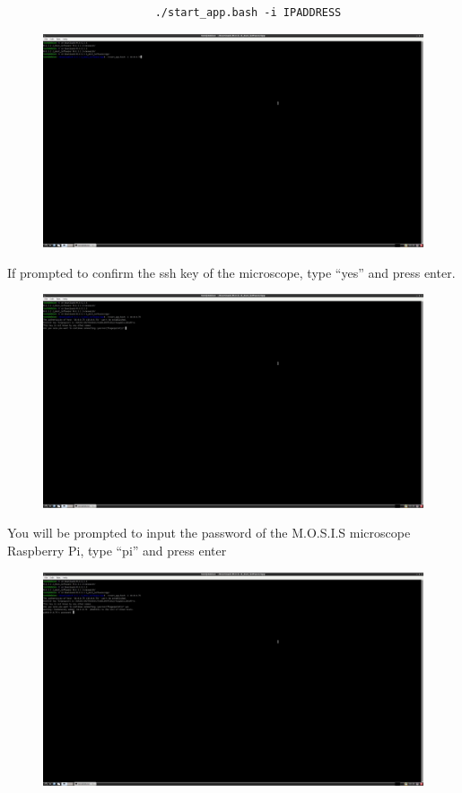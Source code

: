 \documentclass[12pt]{article}
\begin{document}
\begin{center}
	\begin{verbatim}
                       ./start_app.bash -i IPADDRESS
                      \end{verbatim}
	\begin{figure}[H]
		\includegraphics[width=\textwidth]{Figures/Linux-Start-Host-Software-With-IP.png}
	\end{figure}
	\item If prompted to confirm the ssh key of the microscope, type ``yes'' and press enter.
	\begin{figure}[H]
		\includegraphics[width=\textwidth]{Figures/Linux-SSH-Prompt.png}
	\end{figure}
	\item You will be prompted to input the password of the M.O.S.I.S microscope Raspberry Pi, type ``pi'' and press enter
	\begin{figure}[H]
		\includegraphics[width=\textwidth]{Figures/Linux-Pi-Password.png}

\end{figure}
\end{center}
\end{document}
